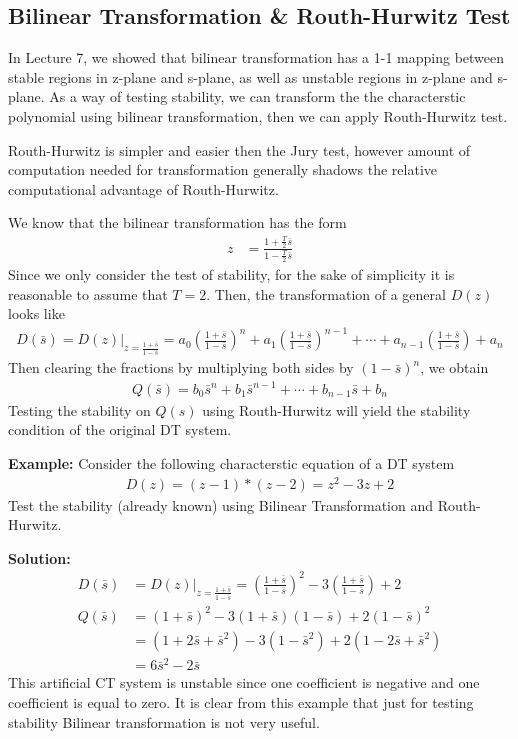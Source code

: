 \documentclass[twoside]{article}
\begin{document}
\subsection*{Bilinear Transformation \& Routh-Hurwitz Test}

In Lecture 7, we showed that bilinear transformation has a 1-1 
mapping between stable regions in z-plane and s-plane, as well as
unstable regions in z-plane and s-plane. As a way of testing
stability, we can transform the the characterstic polynomial 
using bilinear transformation, then we can apply Routh-Hurwitz
test. 

Routh-Hurwitz is simpler and easier then the Jury test,
however amount of computation needed for transformation
generally shadows the relative computational advantage of 
Routh-Hurwitz.

We know that the bilinear transformation has the form
%
\begin{align*}
 z &= \frac{1+\frac{T}{2} \bar{s}}{1-\frac{T}{2} \bar{s}}
\end{align*}
%
Since we only consider the test of stability, for the sake of
simplicity it is reasonable to assume that $T = 2$. Then, the
transformation of a general $D(z)$ looks like
%
%
\begin{align*}
D(\bar{s}) = D(z)|_{z = \frac{1+\bar{s}}{1-\bar{s}}} = 
a_0 \left( \frac{1+\bar{s}}{1-\bar{s}} \right)^n + a_1 \left(
  \frac{1+\bar{s}}{1-\bar{s}} \right)^{n-1} 
+ \cdots + a_{n-1} \left( \frac{1+\bar{s}}{1-\bar{s}} \right) + a_n
\end{align*}
% 
Then clearing the fractions by multiplying both sides by $(1 -
\bar{s})^n$, we obtain
%
\begin{align*}
Q(\bar{s}) = b_0 \bar{s}^n + b_1 \bar{s}^{n-1} + \cdots + b_{n-1}
  \bar{s} + b_n
\end{align*}
%
Testing the stability on $Q(s)$ using Routh-Hurwitz will yield
the stability condition of the original DT system. 

\textbf{Example:} Consider the following characterstic equation 
of a DT system
%
\begin{align}
  D(z) = (z-1)*(z-2) = z^2 -3z +2
\end{align}
%
Test the stability (already known) using Bilinear Transformation and 
Routh-Hurwitz.

\textbf{Solution:} 
%
\begin{align*}
D(\bar{s}) &= D(z)|_{z = \frac{1+\bar{s}}{1-\bar{s}}} =
\left( \frac{1+\bar{s}}{1-\bar{s}} \right)^2 - 3 \left(
  \frac{1+\bar{s}}{1-\bar{s}} \right) + 2
\\
Q(\bar{s}) &= \left( 1+\bar{s} \right)^2 - 3 (1+\bar{s} )( 1-\bar{s}) +
  2 \left( 1 - \bar{s} \right)^2
\\
&= (1 + 2 \bar{s} + \bar{s}^2) - 3 (1 - \bar{s}^2 )  + 2 ( 1 - 2
  \bar{s} + \bar{s}^2 )
\\
&= 6 \bar{s}^2 - 2 \bar{s} 
\end{align*}
%
This artificial CT system is unstable since one coefficient
is negative and one coefficient is equal to zero. It is clear
from this example that just for testing stability Bilinear 
transformation is not very useful. 

\end{document}
